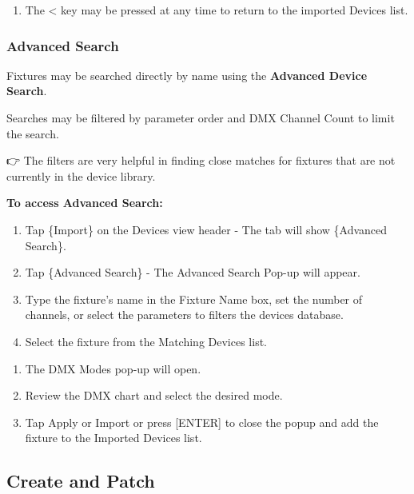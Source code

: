 \documentclass[
]{article}
\providecommand{\tightlist}{%
  \setlength{\itemsep}{0pt}\setlength{\parskip}{0pt}}
\begin{document}
\begin{enumerate}
\def\labelenumi{\arabic{enumi}.}
\setcounter{enumi}{4}
\tightlist
\item
  The \textless{} key may be pressed at any time to return to the imported Devices list.
\end{enumerate}

\hypertarget{advanced-search}{%
\subsubsection{Advanced Search}\label{advanced-search}}

Fixtures may be searched directly by name using the \textbf{Advanced Device Search}.

Searches may be filtered by parameter order and DMX Channel Count to limit the search.

👉 The filters are very helpful in finding close matches for fixtures that are not currently in the device library.

\textbf{To access Advanced Search:}

\begin{enumerate}
\def\labelenumi{\arabic{enumi}.}
\item
  Tap \{Import\} on the Devices view header - The tab will show \{Advanced Search\}.
\item
  Tap \{Advanced Search\} - The Advanced Search Pop-up will appear.
\item
  Type the fixture's name in the Fixture Name box, set the number of channels, or select the parameters to filters the devices database.
\item
  Select the fixture from the Matching Devices list.
\end{enumerate}

\begin{enumerate}
\def\labelenumi{\arabic{enumi}.}
\setcounter{enumi}{4}
\item
  The DMX Modes pop-up will open.
\item
  Review the DMX chart and select the desired mode.
\item
  Tap Apply or Import or press {[}ENTER{]} to close the popup and add the fixture to the Imported Devices list.
\end{enumerate}

\hypertarget{Create-and-Patch-5.3}{%
\subsection{Create and Patch}\label{Create-and-Patch-5.3}}
\end{document}
